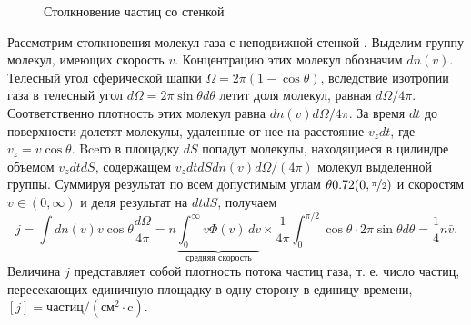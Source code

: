 \begin{wrapfigure}[9]{r}{0.35\tw}
    \centering
    \vspace{-1pc}
    \caption{Столкновение частиц со стенкой}
    \label{pic:mean-particles}    
\end{wrapfigure}
Рассмотрим столкновения молекул газа с неподвижной стенкой . Выделим группу молекул, имеющих скорость $v$. Концентрацию этих молекул обозначим $d n(v)$. Телесный угол сферической шапки $\Omega = 2 \pi (1 - \cos \theta)$, вследствие изотропии газа в телесный угол $d \Omega=2 \pi \sin \theta d \theta$ летит доля молекул, равная $d \Omega / 4 \pi$. Соответственно плотность этих молекул равна $dn(v) d \Omega / 4 \pi$. За время $dt$ до поверхности долетят молекулы, удаленные от нее на расстояние $v_z d t$, где $v_z=v \cos \theta$. Bceго в площадку $d S$ попадут молекулы, находящиеся в цилиндре объемом $v_z d t d S$, содержащем $v_z d t d S d n(v) d \Omega /(4 \pi)$ молекул выделенной группы. Суммируя результат по всем допустимым углам $\theta \in (0, \nicefrac{\pi}{2})$ и скоростям $v \in (0, \infty)$ и деля результат на $d t d S$, получаем
\begin{equation}
j=\int d n(v) v \cos \theta \frac{d \Omega}{4 \pi}=n \underbrace{\int_0^{\infty} v \Phi(v) \, d v}_{\text{средняя скорость}} \times \frac{1}{4 \pi} \int_0^{\pi / 2} \cos \theta \cdot 2 \pi \sin \theta d \theta=\frac{1}{4} n \bar{v} .
\label{eq:mean-count-mxwl}
\end{equation}
Величина $j$ представляет собой плотность потока частиц газа, т. е. число частиц, пересекающих единичную площадку в одну сторону в единицу времени, $[j]= \text{частиц}/\left(\text{см}^2 \cdot \text{c}\right)$.

